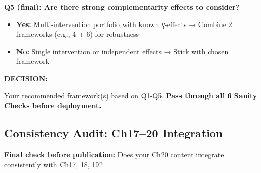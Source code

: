 \begin{center}
{\begin{minipage}{14cm}
\vspace{0.3cm}
\textbf{Q5 (final): Are there strong complementarity effects to consider?}

\begin{itemize}[noitemsep]
\item \textbf{Yes:} Multi-intervention portfolio with known γ-effects → Combine 2 frameworks (e.g., 4 + 6) for robustness
\item \textbf{No:} Single intervention or independent effects → Stick with chosen framework
\end{itemize}

\vspace{0.3cm}
\textbf{DECISION:}

\vspace{0.2cm}
Your recommended framework(s) based on Q1-Q5. \textbf{Pass through all 6 Sanity Checks before deployment.}

\end{minipage}}
\end{center}

\vspace{0.5cm}

\subsection{Consistency Audit: Ch17--20 Integration}
\label{subsec:20-consistency-audit}

\textbf{Final check before publication:} Does your Ch20 content integrate consistently with Ch17, 18, 19?

